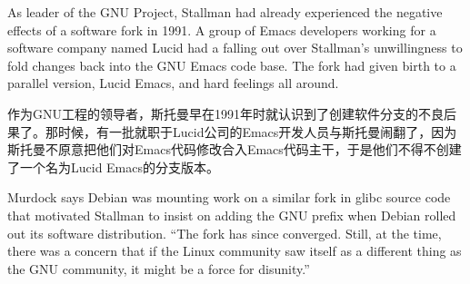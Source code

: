 \ifdefined\eng
As leader of the GNU Project, Stallman had already experienced the negative effects of a software fork in 1991. A group of Emacs developers working for a software company named Lucid had a falling out over Stallman's unwillingness to fold changes back into the GNU Emacs code base. The fork had given birth to a parallel version, Lucid Emacs, and hard feelings all around. 
\fi

\ifdefined\chs
作为GNU工程的领导者，斯托曼早在1991年时就认识到了创建软件分支的不良后果了。那时候，有一批就职于Lucid公司的Emacs开发人员与斯托曼闹翻了，因为斯托曼不原意把他们对Emacs代码修改合入Emacs代码主干，于是他们不得不创建了一个名为Lucid Emacs的分支版本。
\fi

\ifdefined\eng
Murdock says Debian was mounting work on a similar fork in glibc source code that motivated Stallman to insist on adding the GNU prefix when Debian rolled out its software distribution. ``The fork has since converged. Still, at the time, there was a concern that if the Linux community saw itself as a different thing as the GNU community, it might be a force for disunity.''
\fi

